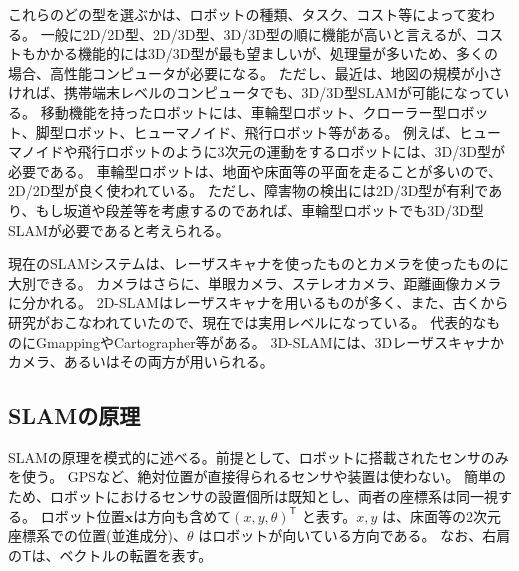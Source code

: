 \begin{table}[h]
  \centering
  \caption{SLAMの種類}
\end{table}

これらのどの型を選ぶかは、ロボットの種類、タスク、コスト等によって変わる。
一般に2D/2D型、2D/3D型、3D/3D型の順に機能が高いと言えるが、コストもかかる機能的には3D/3D型が最も望ましいが、処理量が多いため、多くの場合、高性能コンピュータが必要になる。
ただし、最近は、地図の規模が小さければ、携帯端末レベルのコンピュータでも、3D/3D型SLAMが可能になっている。
移動機能を持ったロボットには、車輪型ロボット、クローラー型ロボット、脚型ロボット、ヒューマノイド、飛行ロボット等がある。
例えば、ヒューマノイドや飛行ロボットのように3次元の運動をするロボットには、3D/3D型が必要である。
車輪型ロボットは、地面や床面等の平面を走ることが多いので、2D/2D型が良く使われている。
ただし、障害物の検出には2D/3D型が有利であり、もし坂道や段差等を考慮するのであれば、車輪型ロボットでも3D/3D型SLAMが必要であると考えられる。

現在のSLAMシステムは、レーザスキャナを使ったものとカメラを使ったものに大別できる。
カメラはさらに、単眼カメラ、ステレオカメラ、距離画像カメラに分かれる。
2D-SLAMはレーザスキャナを用いるものが多く、また、古くから研究がおこなわれていたので、現在では実用レベルになっている。
代表的なものにGmapping\cite{slam:gmapping}やCartographer\cite{slam:cartographer}等がある。
3D-SLAMには、3Dレーザスキャナかカメラ、あるいはその両方が用いられる。

\subsection{SLAMの原理}
SLAMの原理を模式的に述べる。前提として、ロボットに搭載されたセンサのみを使う。
GPSなど、絶対位置が直接得られるセンサや装置は使わない。
簡単のため、ロボットにおけるセンサの設置個所は既知とし、両者の座標系は同一視する。
ロボット位置$\bm{x}$は方向も含めて$(x,y,\theta)^{\mathsf{T}}$ と表す。$x,y$ は、床面等の2次元座標系での位置(並進成分)、$\theta$ はロボットが向いている方向である。
なお、右肩の$\mathsf{T}$は、ベクトルの転置を表す。

